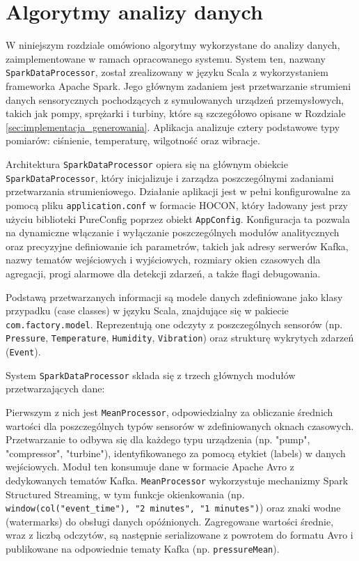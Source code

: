\section{Algorytmy analizy danych}
\label{sec:algorytmy_analizy}

W niniejszym rozdziale omówiono algorytmy wykorzystane do analizy danych, zaimplementowane w ramach opracowanego systemu. System ten, nazwany \texttt{SparkDataProcessor}, został zrealizowany w języku Scala z wykorzystaniem frameworka Apache Spark. Jego głównym zadaniem jest przetwarzanie strumieni danych sensorycznych pochodzących z symulowanych urządzeń przemysłowych, takich jak pompy, sprężarki i turbiny, które są szczegółowo opisane w Rozdziale \ref{sec:implementacja_generowania}. Aplikacja analizuje cztery podstawowe typy pomiarów: ciśnienie, temperaturę, wilgotność oraz wibracje.

Architektura \texttt{SparkDataProcessor} opiera się na głównym obiekcie \texttt{SparkDataProcessor}, który inicjalizuje i zarządza poszczególnymi zadaniami przetwarzania strumieniowego. Działanie aplikacji jest w pełni konfigurowalne za pomocą pliku \texttt{application.conf} w formacie HOCON, który ładowany jest przy użyciu biblioteki PureConfig poprzez obiekt \texttt{AppConfig}. Konfiguracja ta pozwala na dynamiczne włączanie i wyłączanie poszczególnych modułów analitycznych oraz precyzyjne definiowanie ich parametrów, takich jak adresy serwerów Kafka, nazwy tematów wejściowych i wyjściowych, rozmiary okien czasowych dla agregacji, progi alarmowe dla detekcji zdarzeń, a także flagi debugowania.

Podstawą przetwarzanych informacji są modele danych zdefiniowane jako klasy przypadku (case classes) w języku Scala, znajdujące się w pakiecie \texttt{com.factory.model}. Reprezentują one odczyty z poszczególnych sensorów (np. \texttt{Pressure}, \texttt{Temperature}, \texttt{Humidity}, \texttt{Vibration}) oraz strukturę wykrytych zdarzeń (\texttt{Event}).

System \texttt{SparkDataProcessor} składa się z trzech głównych modułów przetwarzających dane:

Pierwszym z nich jest \texttt{MeanProcessor}, odpowiedzialny za obliczanie średnich wartości dla poszczególnych typów sensorów w zdefiniowanych oknach czasowych. Przetwarzanie to odbywa się dla każdego typu urządzenia (np. "pump", "compressor", "turbine"), identyfikowanego za pomocą etykiet (labels) w danych wejściowych. Moduł ten konsumuje dane w formacie Apache Avro z dedykowanych tematów Kafka. \texttt{MeanProcessor} wykorzystuje mechanizmy Spark Structured Streaming, w tym funkcje okienkowania (np. \texttt{window(col("event\_time"), "2 minutes", "1 minutes")}) oraz znaki wodne (watermarks) do obsługi danych opóźnionych. Zagregowane wartości średnie, wraz z liczbą odczytów, są następnie serializowane z powrotem do formatu Avro i publikowane na odpowiednie tematy Kafka (np. \texttt{pressureMean}).


